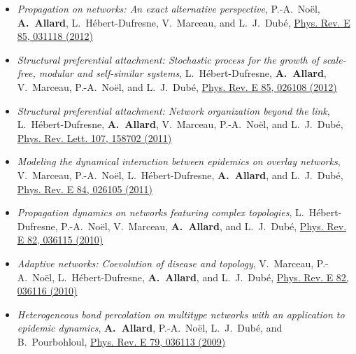 \documentclass[11pt]{article}
\begin{document}
\begin{itemize}
%
  \item \textit{Propagation on networks: An exact alternative perspective}, P.-A.~No\"el, \textbf{A.~Allard}, L.~H\'ebert-Dufresne, V.~Marceau, and L.~J.~Dub\'e, \href{http://dx.doi.org/10.1103/PhysRevE.85.031118}{Phys. Rev. E 85, 031118 (2012)}%
%
  \item \textit{Structural preferential attachment: Stochastic process for the growth of scale-free, modular and self-similar systems}, L.~H\'ebert-Dufresne, \textbf{A.~Allard}, V.~Marceau, P.-A.~No\"el, and L.~J.~Dub\'e, \href{http://dx.doi.org/10.1103/PhysRevE.85.026108}{Phys. Rev. E 85, 026108 (2012)}%
%
  \item \textit{Structural preferential attachment: Network organization beyond the link}, L.~H\'ebert-Dufresne, \textbf{A.~Allard}, V.~Marceau, P.-A.~No\"el, and L.~J.~Dub\'e, \href{http://dx.doi.org/10.1103/PhysRevLett.107.158702}{Phys. Rev. Lett. 107, 158702 (2011)}%
%
  \item \textit{Modeling the dynamical interaction between epidemics on overlay networks}, V.~Marceau, P.-A.~No\"el, L.~H\'ebert-Dufresne, \textbf{A.~Allard}, and L.~J.~Dub\'e, \href{http://dx.doi.org/10.1103/PhysRevE.84.026105}{Phys. Rev. E 84, 026105 (2011)}%
%
  \item \textit{Propagation dynamics on networks featuring complex topologies}, L.~H\'ebert-Dufresne, P.-A.~No\"el, V.~Marceau, \textbf{A.~Allard}, and L.~J.~Dub\'e, \href{http://dx.doi.org/10.1103/PhysRevE.82.036115}{Phys. Rev. E 82, 036115 (2010)}%
%
  \item \textit{Adaptive networks: Coevolution of disease and topology}, V.~Marceau, P.-A.~No\"el, L.~H\'ebert-Dufresne, \mbox{\textbf{A.~Allard}}, and L.~J.~Dub\'e, \href{http://dx.doi.org/10.1103/PhysRevE.82.036116}{Phys. Rev. E 82, 036116 (2010)}%
%
  \item \textit{Heterogeneous bond percolation on multitype networks with an application to epidemic dynamics}, \mbox{\textbf{A.~Allard}}, P.-A.~No\"el, L.~J.~Dub\'e, and B.~Pourbohloul, \href{http://dx.doi.org/10.1103/PhysRevE.79.036113}{Phys. Rev. E 79, 036113 (2009)}%
%
\end{itemize}
\end{document}
